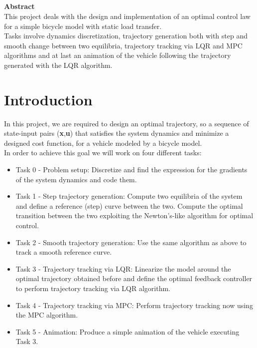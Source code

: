 \documentclass[a4paper,11pt,oneside]{report}
\begin{document}
\begin{center}
\chapter*{}
\thispagestyle{empty}
{\Huge \textbf{Abstract}}\\
This project deals with the design and implementation of an 
optimal control law for a simple bicycle model with static load transfer.\\
Tasks involve dynamics discretization, trajectory generation 
both with step and smooth change between two equilibria,
trajectory tracking via LQR and MPC algorithms and at last an animation of the vehicle
following the trajectory generated with the LQR algorithm.
\vspace{15mm}
\end{center}

\tableofcontents \thispagestyle{empty}

\chapter*{Introduction}
In this project, we are required to design an optimal trajectory, so a sequence of state-input pairs (\textbf{x},\textbf{u})
that satisfies the system dynamics and minimize a designed cost function, for a vehicle modeled by a bicycle model.\\
In order to achieve this goal we will work on four different tasks:
\begin{itemize}
	\item Task 0 - Problem setup:
Discretize and find the expression for the gradients of the system dynamics and code them. 

    \item Task 1 - Step trajectory generation:
Compute two equilibria of the system and define a reference (step) curve between the two.
Compute the optimal transition between the two exploiting the Newton's-like algorithm for optimal control. 

      \item Task 2 - Smooth trajectory generation:
Use the same algorithm as above to track a smooth reference curve.

    \item Task 3 - Trajectory tracking via LQR:
Linearize the model around the optimal trajectory obtained before and define the optimal feedback controller
to perform trajectory tracking via LQR algorithm.

    \item Task 4 - Trajectory tracking via MPC:
Perform trajectory tracking now using the MPC algorithm.

    \item Task 5 - Animation:
Produce a simple animation of the vehicle executing Task 3.
\end{itemize}
\end{document}
